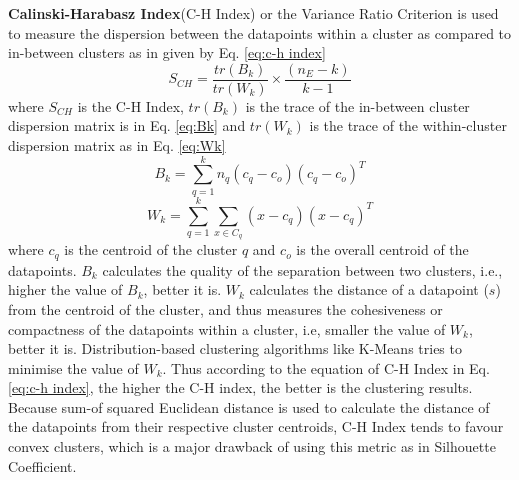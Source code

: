\vspace{5 mm}

\textbf{Calinski-Harabasz Index}(C-H Index) or the Variance Ratio Criterion is used to measure the dispersion between the datapoints within a cluster as compared to in-between clusters as in given by Eq. \ref*{eq:c-h index}
\begin{equation}
  \label{eq:c-h index}
  \mathit{S_{CH}}= \mathit{\frac{tr(B_{k})}{tr(W_{k})}} \times \mathit{\frac{(n_{E}-k)}{k-1}}
\end{equation}
where $S_{CH}$ is the C-H Index, $tr(B_{k})$ is the trace of the in-between cluster dispersion matrix is in Eq. \ref*{eq:Bk}  and $tr(W_{k})$ is the trace of the within-cluster dispersion matrix as in Eq. \ref*{eq:Wk}
\begin{equation}
  \label{eq:Bk}
  \mathit{B_{k}}= \mathit{\sum_{q=1}^{k}n_{q}(c_{q}-c_{o})(c_{q}-c_{o})^T} 
\end{equation}
\begin{equation}
  \label{eq:Wk}
  \mathit{W_{k}}= \mathit{\sum_{q=1}^{k}\sum_{x \in C_{q}}(x-c_{q})(x-c_{q})^T} 
\end{equation}
where $c_{q}$ is the centroid of the cluster $q$ and $c_{o}$ is the overall centroid of the datapoints. $B_{k}$ calculates the quality of the separation between two clusters, i.e., higher the value of $B_{k}$, better it is. $W_{k}$ calculates the distance of a datapoint ($s$) from the centroid of the cluster, and thus measures the cohesiveness or compactness of the datapoints within a cluster, i.e, smaller the value of $W_{k}$, better it is. Distribution-based clustering algorithms like K-Means tries to minimise the value of $W_{k}$. Thus according to the equation of C-H Index in Eq. \ref*{eq:c-h index}, the higher the C-H index, the better is the clustering results. Because sum-of squared Euclidean distance is used to calculate the distance of the datapoints from their respective cluster centroids, C-H Index tends to favour convex clusters, which is a major drawback of using this metric as in Silhouette Coefficient.\cite*{chindex}
